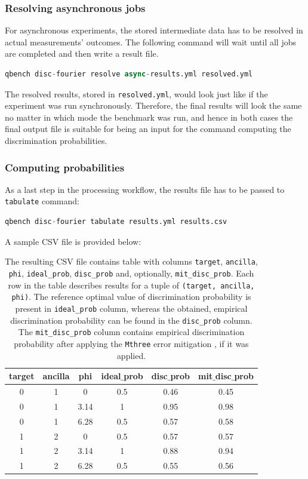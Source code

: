\documentclass[preprint,12pt, a4paper, dvipsnames]{elsarticle}
\newcommand{\1}{{\rm 1\hspace{-0.9mm}l}}
\theoremstyle{definition}
\begin{document}
\subsubsection{Resolving asynchronous jobs}
For asynchronous experiments, the stored intermediate data has to be resolved in actual
measurements' outcomes. The following command will wait until all jobs are completed and then write
a result file.
\begin{lstlisting}[language=Python]
qbench disc-fourier resolve async-results.yml resolved.yml
\end{lstlisting}
The resolved results, stored in \texttt{resolved.yml}, would look just like if the experiment was
run synchronously. Therefore, the final results will look the same no matter in which mode the
benchmark was run, and hence in both cases the final output file is suitable for being an input for
the command computing the discrimination probabilities.

\subsubsection{Computing probabilities}
As a last step in the processing workflow, the results file has to be passed to \texttt{tabulate}
command:
\begin{lstlisting}[language=Python]
qbench disc-fourier tabulate results.yml results.csv
\end{lstlisting}
A sample CSV file is provided below:
\begin{table}[ht!]
\begin{center}
	\begin{tabular}{|c c c c c c|} 
		\hline
		target & ancilla & phi & ideal$\_$prob  & disc$\_$prob & mit$\_$disc$\_$prob \\ [0.5ex] 
		\hline\hline
		0 & 1 & 0 & 0.5 & 0.46 & 0.45  \\ 
		\hline
		0 & 1 & 3.14 & 1 & 0.95 & 0.98  \\
		\hline
		0 & 1 & 6.28 & 0.5 & 0.57 & 0.58  \\
		\hline
		1 & 2 & 0 & 0.5  & 0.57 & 0.57 \\
		\hline
		1 & 2 & 3.14 & 1 & 0.88 & 0.94  \\ 
		\hline
		1 & 2 & 6.28 & 0.5 & 0.55 & 0.56  \\ 
		\hline
	\end{tabular}
\caption{The resulting CSV file contains table with columns \texttt{target}, \texttt{ancilla}, \texttt{phi},
	\texttt{ideal\_prob}, \texttt{disc\_prob} and, optionally, \texttt{mit\_disc\_prob}. Each row in the
	table describes results for a tuple of \texttt{(target, ancilla, phi)}.  The reference optimal value
	of discrimination probability is present in \texttt{ideal\_prob} column, whereas the obtained,
	empirical discrimination probability can be found in the \texttt{disc\_prob} column. The
	\texttt{mit\_disc\_prob} column contains empirical discrimination probability after applying the
	\texttt{Mthree} error mitigation \cite{mthree, mthreepublication}, if it was applied.}
\label{fig:tabulateresults}
\end{center}
\end{table}
\end{document}
